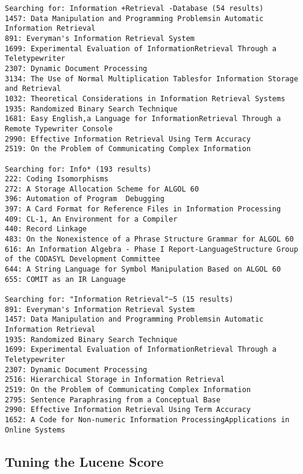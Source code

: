 \documentclass[11pt,a4paper,twoside,svgnames]{article}
\begin{document}
\begin{lstlisting}
Searching for: Information +Retrieval -Database (54 results)
1457: Data Manipulation and Programming Problemsin Automatic Information Retrieval
891: Everyman's Information Retrieval System
1699: Experimental Evaluation of InformationRetrieval Through a Teletypewriter
2307: Dynamic Document Processing
3134: The Use of Normal Multiplication Tablesfor Information Storage and Retrieval
1032: Theoretical Considerations in Information Retrieval Systems
1935: Randomized Binary Search Technique
1681: Easy English,a Language for InformationRetrieval Through a Remote Typewriter Console
2990: Effective Information Retrieval Using Term Accuracy
2519: On the Problem of Communicating Complex Information

Searching for: Info* (193 results)
222: Coding Isomorphisms
272: A Storage Allocation Scheme for ALGOL 60
396: Automation of Program  Debugging
397: A Card Format for Reference Files in Information Processing
409: CL-1, An Environment for a Compiler
440: Record Linkage
483: On the Nonexistence of a Phrase Structure Grammar for ALGOL 60
616: An Information Algebra - Phase I Report-LanguageStructure Group of the CODASYL Development Committee
644: A String Language for Symbol Manipulation Based on ALGOL 60
655: COMIT as an IR Language

Searching for: "Information Retrieval"~5 (15 results)
891: Everyman's Information Retrieval System
1457: Data Manipulation and Programming Problemsin Automatic Information Retrieval
1935: Randomized Binary Search Technique
1699: Experimental Evaluation of InformationRetrieval Through a Teletypewriter
2307: Dynamic Document Processing
2516: Hierarchical Storage in Information Retrieval
2519: On the Problem of Communicating Complex Information
2795: Sentence Paraphrasing from a Conceptual Base
2990: Effective Information Retrieval Using Term Accuracy
1652: A Code for Non-numeric Information ProcessingApplications in Online Systems

	\end{lstlisting}
	
	\subsection{Tuning the Lucene Score}
	
\end{document}
